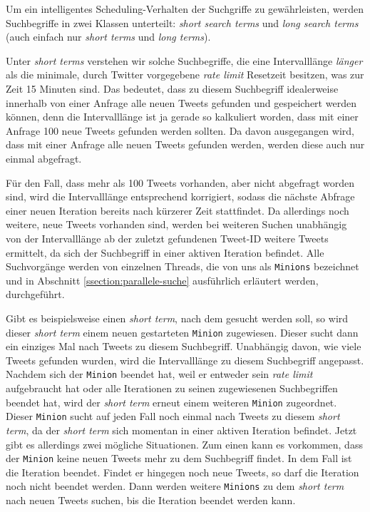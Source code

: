 Um ein intelligentes Scheduling-Verhalten der Suchgriffe zu gewährleisten, werden Suchbegriffe in zwei Klassen unterteilt: \textit{short search terms} und \textit{long search terms} (auch einfach nur \textit{short terms} und \textit{long terms}).

Unter \textit{short terms} verstehen wir solche Suchbegriffe, die eine Intervalllänge \emph{länger} als die minimale, durch Twitter vorgegebene \textit{rate limit} Resetzeit besitzen, was zur Zeit 15 Minuten sind. Das bedeutet, dass zu diesem Suchbegriff idealerweise innerhalb von einer Anfrage alle neuen Tweets gefunden und gespeichert werden können, denn die Intervalllänge ist ja gerade so kalkuliert worden, dass mit einer Anfrage 100 neue Tweets gefunden werden sollten. Da davon ausgegangen wird, dass mit einer Anfrage alle neuen Tweets gefunden werden, werden diese auch nur einmal abgefragt.

Für den Fall, dass mehr als 100 Tweets vorhanden, aber nicht abgefragt worden sind, wird die Intervalllänge entsprechend korrigiert, sodass die nächste Abfrage einer neuen Iteration bereits nach kürzerer Zeit stattfindet. Da allerdings noch weitere, neue Tweets vorhanden sind, werden bei weiteren Suchen unabhängig von der Intervalllänge ab der zuletzt gefundenen Tweet-ID weitere Tweets ermittelt, da sich der Suchbegriff in einer aktiven Iteration befindet. Alle Suchvorgänge werden von einzelnen Threads, die von uns als \texttt{Minions} bezeichnet und in Abschnitt \ref{ssection:parallele-suche} ausführlich erläutert werden, durchgeführt.

Gibt es beispielsweise einen \textit{short term}, nach dem gesucht werden soll, so wird dieser \textit{short term} einem neuen gestarteten \texttt{Minion} zugewiesen.
Dieser sucht dann ein einziges Mal nach Tweets zu diesem Suchbegriff.
Unabhängig davon, wie viele Tweets gefunden wurden, wird die Intervalllänge zu diesem Suchbegriff angepasst.
Nachdem sich der \texttt{Minion} beendet hat, weil er entweder sein \textit{rate limit} aufgebraucht hat oder alle Iterationen zu seinen zugewiesenen Suchbegriffen beendet hat, wird der \textit{short term} erneut einem weiteren \texttt{Minion} zugeordnet.
Dieser \texttt{Minion} sucht auf jeden Fall noch einmal nach Tweets zu diesem \textit{short term}, da der \textit{short term} sich momentan in einer aktiven Iteration befindet.
Jetzt gibt es allerdings zwei mögliche Situationen.
Zum einen kann es vorkommen, dass der \texttt{Minion} keine neuen Tweets mehr zu dem Suchbegriff findet.
In dem Fall ist die Iteration beendet.
Findet er hingegen noch neue Tweets, so darf die Iteration noch nicht beendet werden.
Dann werden weitere \texttt{Minions} zu dem \textit{short term} nach neuen Tweets suchen, bis die Iteration beendet werden kann.

